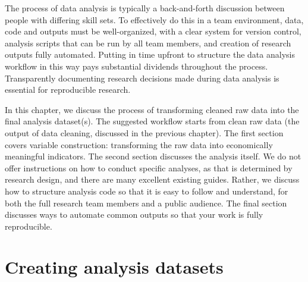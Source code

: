 
\begin{fullwidth}



The process of data analysis is typically
a back-and-forth discussion between people
with differing skill sets.
To effectively do this in a team environment,
data, code and outputs must be well-organized,
with a clear system for version control,
analysis scripts that can be run by all team members,
and creation of research outputs fully automated.
Putting in time upfront to structure the data analysis workflow
in this way pays substantial dividends throughout the process.
Transparently documenting research decisions made during data analysis
is essential for reproducible research.

In this chapter, we discuss the process of transforming
cleaned raw data into the final analysis dataset(s).
The suggested workflow starts from clean raw data
(the output of data cleaning, discussed in the previous chapter).
The first section covers variable construction:
transforming the raw data into economically meaningful indicators.
The second section discusses the analysis itself.
We do not offer instructions on how to conduct specific analyses,
as that is determined by research design,
and there are many excellent existing guides.
Rather, we discuss how to structure analysis code
so that it is easy to follow and understand,
for both the full research team members and a public audience.
The final section discusses ways to automate common outputs
so that your work is fully reproducible.

\end{fullwidth}


\section{Creating analysis datasets}

